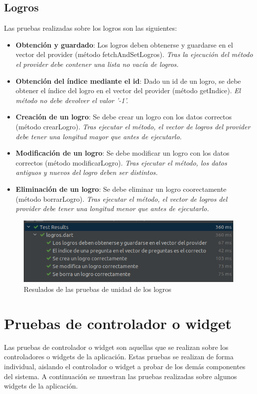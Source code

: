 \subsection{Logros}
\label{subsec:pruebas-unidad-logros}
Las pruebas realizadas sobre los logros son las siguientes:
\begin{itemize}
    \item \textbf{Obtención y guardado}: Los logros deben obtenerse y guardarse en el vector del provider (método fetchAndSetLogros). \textit{Tras la ejecución del método el provider debe contener una lista no vacía de logros.}
    \item \textbf{Obtención del índice mediante el id}: Dado un id de un logro, se debe obtener el índice del logro en el vector del provider (método getIndice). \textit{El método no debe devolver el valor '-1'.}
    \item \textbf{Creación de un logro}: Se debe crear un logro con los datos correctos (método crearLogro). \textit{Tras ejecutar el método, el vector de logros del provider debe tener una longitud mayor que antes de ejecutarlo.}
    \item \textbf{Modificación de un logro}: Se debe modificar un logro con los datos correctos (método modificarLogro). \textit{Tras ejecutar el método, los datos antiguos y nuevos del logro deben ser distintos.}
    \item \textbf{Eliminación de un logro}: Se debe eliminar un logro coorectamente (método borrarLogro). \textit{Tras ejecutar el método, el vector de logros del provider debe tener una longitud menor que antes de ejecutarlo.}
\end{itemize}

\begin{figure}[H]
    \centering
    \includegraphics[width=\textwidth]{imagenes/c8/pruebalogros.png}
    \caption{Resulados de las pruebas de unidad de los logros}
    \label{fig:pruebas_unidad_logros}
\end{figure}


\section{Pruebas de controlador o widget}
\label{sec:pruebas-controlador}
Las pruebas de controlador o widget son aquellas que se realizan sobre los controladores o widgets de la aplicación. Estas pruebas se realizan de forma individual, aislando el controlador o widget a probar de los demás componentes del sistema.
A continuación se muestran las pruebas realizadas sobre algunos widgets de la aplicación.

